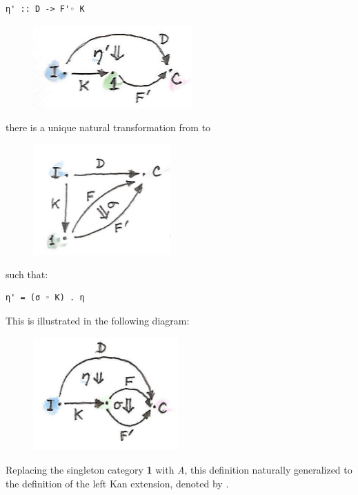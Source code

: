 \begin{Verbatim}[commandchars=\\\{\}]
η' :: D -> F'◦ K
\end{Verbatim}

\begin{figure}[H]
\centering
\includegraphics[width=2.40625in]{images/kan10b.jpg}
\end{figure}

\noindent
there is a unique natural transformation  from  to

\begin{figure}[H]
\centering
\includegraphics[width=2.08333in]{images/kan14.jpg}
\end{figure}

\noindent
such that:

\begin{Verbatim}[commandchars=\\\{\}]
η' = (σ ◦ K) . η
\end{Verbatim}
This is illustrated in the following diagram:

\begin{figure}[H]
\centering
\includegraphics[width=2.19792in]{images/kan112.jpg}
\end{figure}

\noindent
Replacing the singleton category \textbf{1} with \emph{A}, this
definition naturally generalized to the definition of the left Kan
extension, denoted by .

